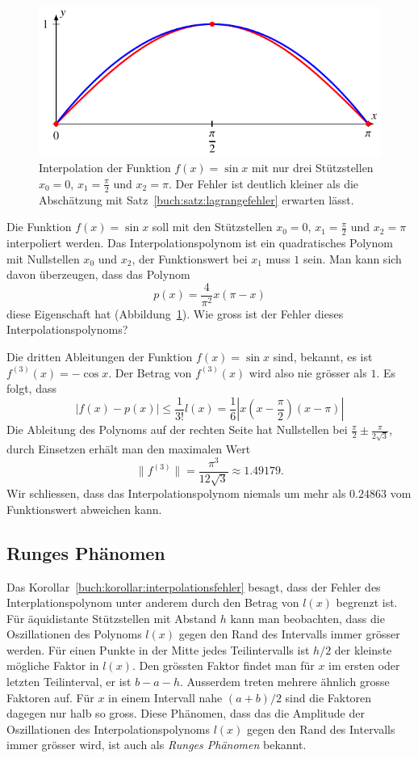 \begin{beispiel}
\begin{figure}
\centering
\includegraphics{chapters/30-interpolation/figures/sin.pdf}
\caption{Interpolation der Funktion $f(x)=\sin x$ mit nur drei 
Stützstellen $x_0=0$, $x_1=\frac{\pi}2$ und $x_2=\pi$.
Der Fehler ist deutlich kleiner als die Abschätzung mit
Satz~\ref{buch:satz:lagrangefehler} erwarten lässt.
\label{buch:figure:sin}}
\end{figure}
Die Funktion $f(x)=\sin x$ soll mit den Stützstellen $x_0=0$, $x_1=\frac{\pi}2$
und $x_2=\pi$ interpoliert werden.
Das Interpolationspolynom ist ein quadratisches Polynom mit Nullstellen
$x_0$ und $x_2$, der Funktionswert bei $x_1$ muss $1$ sein.
Man kann sich davon überzeugen, dass das Polynom
\[
p(x) = \frac{4}{\pi^2} x(\pi -x )
\]
diese Eigenschaft hat (Abbildung~\ref{buch:figure:sin}).
Wie gross ist der Fehler dieses Interpolationspolynoms?

Die dritten Ableitungen der Funktion $f(x)=\sin x$ sind, bekannt, es ist
$f^{(3)}(x)=-\cos x$.
Der Betrag von $f^{(3)}(x)$ wird also nie grösser als $1$.
Es folgt, dass
\[
|f(x)-p(x)| \le \frac{1}{3!} l(x)
=
\frac16 |x(x-{\textstyle\frac{\pi}2})(x-\pi)|
\]
Die Ableitung des Polynoms auf der rechten Seite hat Nullstellen bei
$\frac{\pi}2 \pm \frac{\pi}{2\sqrt{3}}$,
durch Einsetzen erhält man den maximalen Wert
\[
\|f^{(3)}\|
=
\frac{\pi^3}{12\sqrt{3}}\approx 1.49179.
\]
Wir schliessen, dass das Interpolationspolynom niemals um mehr als $0.24863$
vom Funktionswert abweichen kann.
\end{beispiel}

%
%
\subsection{Runges Phänomen
\label{buch:section:interpolation:runge}}
Das Korollar~\ref{buch:korollar:interpolationsfehler} besagt, dass der
Fehler des Interplationspolynom unter anderem durch den Betrag von $l(x)$
begrenzt ist.
Für äquidistante Stützstellen mit Abstand $h$ kann man beobachten,
dass die Oszillationen des Polynoms $l(x)$ gegen den Rand des Intervalls
immer grösser werden.
Für einen Punkte in der Mitte jedes Teilintervalls ist $h/2$ der kleinste
mögliche Faktor in $l(x)$. 
Den grössten Faktor findet man für $x$ im ersten oder letzten Teilinterval,
er ist $b-a-h$.
Ausserdem treten mehrere ähnlich grosse Faktoren auf.
Für $x$ in einem Intervall nahe $(a+b)/2$ sind die Faktoren
dagegen nur halb so gross.
Diese Phänomen, dass das die Amplitude der Oszillationen des
Interpolationspolynoms $l(x)$ gegen den Rand des Intervalls immer
grösser wird, ist auch als {\em Runges Phänomen} bekannt.


